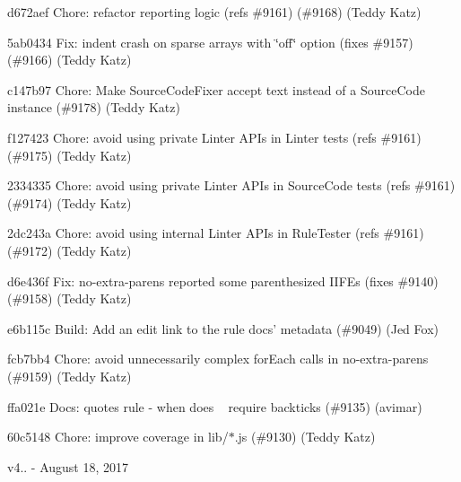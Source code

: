 \begin{DoxyItemize}
\item d672aef Chore\+: refactor reporting logic (refs \#9161) (\#9168) (Teddy Katz)
\item 5ab0434 Fix\+: indent crash on sparse arrays with \char`\"{}off\char`\"{} option (fixes \#9157) (\#9166) (Teddy Katz)
\item c147b97 Chore\+: Make Source\+Code\+Fixer accept text instead of a Source\+Code instance (\#9178) (Teddy Katz)
\item f127423 Chore\+: avoid using private Linter A\+P\+Is in Linter tests (refs \#9161) (\#9175) (Teddy Katz)
\item 2334335 Chore\+: avoid using private Linter A\+P\+Is in Source\+Code tests (refs \#9161) (\#9174) (Teddy Katz)
\item 2dc243a Chore\+: avoid using internal Linter A\+P\+Is in Rule\+Tester (refs \#9161) (\#9172) (Teddy Katz)
\item d6e436f Fix\+: no-\/extra-\/parens reported some parenthesized I\+I\+F\+Es (fixes \#9140) (\#9158) (Teddy Katz)
\item e6b115c Build\+: Add an edit link to the rule docs’ metadata (\#9049) (Jed Fox)
\item fcb7bb4 Chore\+: avoid unnecessarily complex for\+Each calls in no-\/extra-\/parens (\#9159) (Teddy Katz)
\item ffa021e Docs\+: quotes rule -\/ when does ~\newline
 require backticks (\#9135) (avimar)
\item 60c5148 Chore\+: improve coverage in lib/$\ast$.js (\#9130) (Teddy Katz)
\end{DoxyItemize}

v4.. -\/ August 18, 2017


